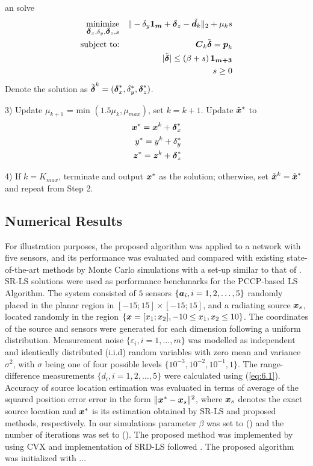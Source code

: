 \noindent
an solve
\setcounter{abc}{0}
\begin{eqnarray} 
\nonumber
\mathop{\mbox{minimize}}_{\mbox{\boldmath${\delta}$}_x, \delta_y, \mbox{\boldmath${\delta}$}_z, s}& &\| -\delta_y\mbox{\boldmath${1_m}$} + \mbox{\boldmath${\delta}$}_z - \tilde{\mbox{\boldmath$d$}_k} \|_2 + \mu_ks
\\ 
\nonumber
\mbox{subject to:}& &\mbox{\boldmath$C$}_k\tilde{\mbox{\boldmath${\delta}$}}  = \mbox{\boldmath$p$}_k 
\\
\nonumber
 & &|\tilde{\mbox{\boldmath${\delta}$}}|  \leq \left(\beta + s\right)\mbox{\boldmath${1_{m+3}}$} 
 \\
\nonumber
& & s \geq 0
\end{eqnarray}
\noindent
Denote the solution as $\tilde{\mbox{\boldmath${\delta}$}}^k = (\mbox{\boldmath${\delta}$}_x^*, \delta_y^*, \mbox{\boldmath${\delta}$}_z^*)$. 



3) Update  $\mu_{k+1} $ = min $(1.5\mu_k, \mu_{max})$, set $k = k+1$. Update $\tilde{\mbox{\boldmath$x$}}^{*}$ to
\setcounter{abc}{0}
\begin{eqnarray} 
\nonumber
\mbox{\boldmath$x$}^{*} = \mbox{\boldmath$x$}^k + \mbox{\boldmath${\delta}$}_x^* \\
\nonumber
y^{*} = y^k + \delta_y^* \\
\nonumber
\mbox{\boldmath$z$}^{*} = \mbox{\boldmath$z$}^k + \mbox{\boldmath${\delta}$}_z^*
\end{eqnarray}



4) If $k = K_{max}$, terminate and output $\mbox{\boldmath$x$}^*$ as the solution; otherwise, set $\tilde{\mbox{\boldmath$x$}}^{k} = \tilde{\mbox{\boldmath$x$}}^{*}$  and repeat from Step 2. 


\subsection{Numerical Results}

For illustration purposes, the proposed algorithm was applied to a network with five sensors, and its performance was evaluated and compared with existing state-of-the-art methods by Monte Carlo simulations with a set-up similar to that of \cite{BeckStLi}. SR-LS solutions were used as performance benchmarks for the PCCP-based LS Algorithm. The system consisted of $5$ sensors $\{\mbox{\boldmath$a$}_i, i = 1, 2,\ldots,5\}$ randomly placed in the planar region in $[-15;15]\times[-15;15]$, and a radiating source $\mbox{\boldmath$x$}_s$, located randomly in the region $\{\mbox{\boldmath$x$}=[x_1;x_2], -10\leq x_1,x_2\leq 10\}$. The coordinates of the source and sensors were generated for each dimension following a uniform distribution. Measurement noise $\{\varepsilon_i, i=1,\ldots,m\}$ was modelled as independent and identically distributed (i.i.d) random variables with zero mean and variance $\sigma^2$, with $\sigma$ being one of four possible levels $\{10^{-3}, 10^{-2}, 10^{-1}, 1\}$.  The range-difference measurements $\{d_i, i=1, 2,\ldots,5\}$ were calculated using (\ref{eq:6.1}). Accuracy of source location estimation was evaluated in terms of average of the squared position error error in the form $\|\mbox{\boldmath$x$}^*-\mbox{\boldmath$x$}_s\|^2$, where $\mbox{\boldmath$x$}_s$ denotes the exact source location and $\mbox{\boldmath$x$}^*$ is its estimation obtained by SR-LS and proposed methods, respectively.  
In our simulations parameter $\beta$ was set to () and the number of iterations was set to (). The proposed method was implemented by using  CVX  \cite{cvx} and implementation of SRD-LS followed \cite{BeckStLi}. The proposed algorithm was initialized with ...  